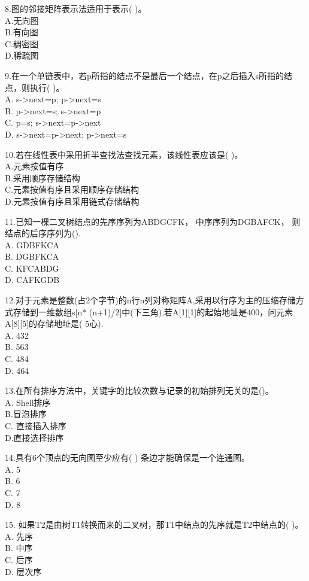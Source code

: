 8.图的邻接矩阵表示法适用于表示( )。 \\
A.无向图 \\
B.有向图 \\
C.稠密图 \\
D.稀疏图

9.在一个单链表中，若p所指的结点不是最后一个结点，在p之后插入s所指的结点，则执行( )。 \\
A. s->next=p; p->next=s \\
B. p->next=s; s->next=p \\
C. p=s; s->next=p->next \\
D. s->next=p->next; p->next=s

10.若在线性表中采用折半查找法查找元素，该线性表应该是( )。 \\
A.元素按值有序 \\
B.采用顺序存储结构 \\
C.元素按值有序且采用顺序存储结构 \\
D.元素按值有序且采用链式存储结构

11.已知一棵二叉树结点的先序序列为ABDGCFK， 中序序列为DGBAFCK， 则结点的后序序列为(). \\
A. GDBFKCA \\
B. DGBFKCA \\
C. KFCABDG \\
D. CAFKGDB

12.对于元素是整数(占2个字节)的n行n列对称矩阵A,采用以行序为主的压缩存储方式存储到一维数组s[n* (n+1)/2]中(下三角),若A[1][1]的起始地址是400，问元素A[8][5]的存储地址是( 5心). \\
A. 432 \\
B. 563 \\
C. 484 \\
D. 464

13.在所有排序方法中，关键字的比较次数与记录的初始排列无关的是()。 \\
A. Shell排序 \\
B.冒泡排序 \\
C. 直接插入排序 \\
D.直接选择排序

14.具有6个顶点的无向图至少应有( ) 条边才能确保是一个连通图。 \\
A. 5 \\
B. 6 \\
C. 7 \\
D. 8

15. 如果T2是由树T1转换而来的二叉树，那T1中结点的先序就是T2中结点的( )。 \\
A. 先序 \\
B. 中序 \\
C. 后序 \\
D. 层次序


